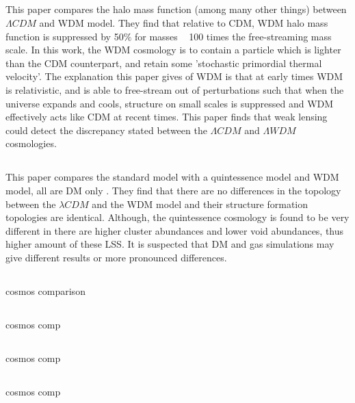 \documentclass[fleqn,usenatbib]{mnras}
\begin{document}
\subsection{\citet{Smith_11}}
This paper compares the halo mass function (among many other things) between $\Lambda CDM$ and WDM model. They find that relative to CDM, WDM halo mass function is suppressed by 50$\%$ for masses ~ 100 times the free-streaming mass scale. In this work, the WDM cosmology is to contain a particle which is lighter than the CDM counterpart, and retain some 'stochastic primordial thermal velocity'. The explanation this paper gives of WDM is that at early times WDM is relativistic, and is able to free-stream out of perturbations such that when the universe expands and cools, structure on small scales is suppressed and WDM effectively acts like CDM at recent times. This paper finds that weak lensing could detect the discrepancy stated between the $\Lambda CDM$ and $\Lambda WDM$ cosmologies.

\subsection{\citet{Watts_17}}
This paper compares the standard model with a quintessence model and WDM model, all are DM only . They find that there are no differences in the topology between the $\lambda CDM$ and the WDM model and their structure formation topologies are identical. Although, the quintessence cosmology is found to be very different in there are higher cluster abundances and lower void abundances, thus higher amount of these LSS. It is suspected that DM and gas simulations may give different results or more pronounced differences.

\subsection{\citet{Baldi_10}}
cosmos comparison
\subsection{\citet{Baldi_12}}
cosmos comp
\subsection{\citet{Li_11}}
cosmos comp
\subsection{\citet{Macci_04}}
cosmos comp
\end{document}
